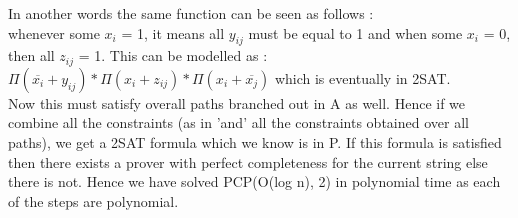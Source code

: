 \documentclass[12pt]{exam}
\begin{document}
\begin{questions}
\begin{solution}
In another words the same function can be seen as follows :\\
whenever some $x_i$ = 1, it means all $y_{ij}$ must be equal to 1 and when
some $x_i$ = 0, then all $z_{ij}$ = 1. This can be modelled as :\\
$\Pi(\overline{x_i} + y_{ij})* \Pi(x_i + z_{ij}) * \Pi(x_i + \overline{x_j})$ which is eventually in
2SAT.\\
Now this must satisfy overall paths branched out in A as well. Hence if
we combine all the constraints (as in 'and' all the constraints obtained
over all paths), we get a 2SAT formula which we know is in P. If this formula
is satisfied then there exists a prover with perfect completeness
for the current string else there is not. Hence we have solved
PCP(O(log n), 2) in polynomial time as each of the steps are polynomial.
\end{solution}
\end{questions}
\end{document}
